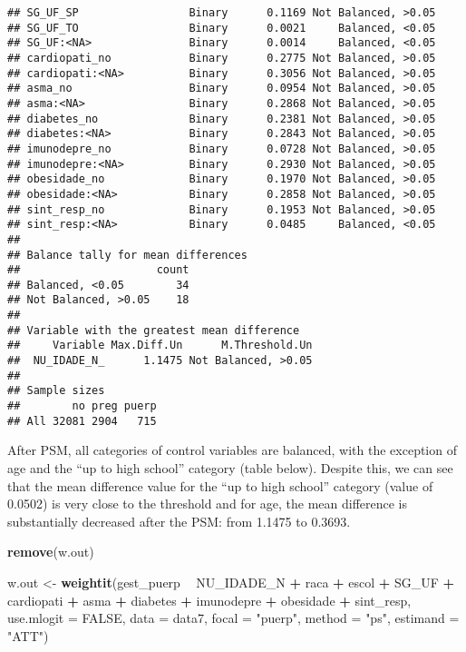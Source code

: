 \documentclass[
]{article}
\newenvironment{Shaded}{\begin{snugshade}}{\end{snugshade}}
\newcommand{\DataTypeTok}[1]{\textcolor[rgb]{0.13,0.29,0.53}{#1}}
\newcommand{\KeywordTok}[1]{\textcolor[rgb]{0.13,0.29,0.53}{\textbf{#1}}}
\newcommand{\NormalTok}[1]{#1}
\newcommand{\OperatorTok}[1]{\textcolor[rgb]{0.81,0.36,0.00}{\textbf{#1}}}
\newcommand{\OtherTok}[1]{\textcolor[rgb]{0.56,0.35,0.01}{#1}}
\newcommand{\StringTok}[1]{\textcolor[rgb]{0.31,0.60,0.02}{#1}}
\begin{document}
\begin{verbatim}
## SG_UF_SP                 Binary      0.1169 Not Balanced, >0.05
## SG_UF_TO                 Binary      0.0021     Balanced, <0.05
## SG_UF:<NA>               Binary      0.0014     Balanced, <0.05
## cardiopati_no            Binary      0.2775 Not Balanced, >0.05
## cardiopati:<NA>          Binary      0.3056 Not Balanced, >0.05
## asma_no                  Binary      0.0954 Not Balanced, >0.05
## asma:<NA>                Binary      0.2868 Not Balanced, >0.05
## diabetes_no              Binary      0.2381 Not Balanced, >0.05
## diabetes:<NA>            Binary      0.2843 Not Balanced, >0.05
## imunodepre_no            Binary      0.0728 Not Balanced, >0.05
## imunodepre:<NA>          Binary      0.2930 Not Balanced, >0.05
## obesidade_no             Binary      0.1970 Not Balanced, >0.05
## obesidade:<NA>           Binary      0.2858 Not Balanced, >0.05
## sint_resp_no             Binary      0.1953 Not Balanced, >0.05
## sint_resp:<NA>           Binary      0.0485     Balanced, <0.05
## 
## Balance tally for mean differences
##                     count
## Balanced, <0.05        34
## Not Balanced, >0.05    18
## 
## Variable with the greatest mean difference
##     Variable Max.Diff.Un      M.Threshold.Un
##  NU_IDADE_N_      1.1475 Not Balanced, >0.05
## 
## Sample sizes
##        no preg puerp
## All 32081 2904   715
\end{verbatim}

After PSM, all categories of control variables are balanced, with the
exception of age and the ``up to high school'' category (table below).
Despite this, we can see that the mean difference value for the ``up to
high school'' category (value of 0.0502) is very close to the threshold
and for age, the mean difference is substantially decreased after the
PSM: from 1.1475 to 0.3693.

\begin{Shaded}
\begin{Highlighting}[]
\KeywordTok{remove}\NormalTok{(w.out)}

\NormalTok{w.out <-}\StringTok{ }\KeywordTok{weightit}\NormalTok{(gest_puerp }\OperatorTok{~}\StringTok{ }\NormalTok{NU_IDADE_N }\OperatorTok{+}\StringTok{ }\NormalTok{raca }\OperatorTok{+}\StringTok{ }\NormalTok{escol }\OperatorTok{+}\StringTok{ }\NormalTok{SG_UF }\OperatorTok{+}\StringTok{ }\NormalTok{cardiopati }\OperatorTok{+}\StringTok{ }\NormalTok{asma }\OperatorTok{+}\StringTok{ }
\StringTok{                    }\NormalTok{diabetes }\OperatorTok{+}\StringTok{ }\NormalTok{imunodepre }\OperatorTok{+}\StringTok{ }\NormalTok{obesidade }\OperatorTok{+}\StringTok{ }\NormalTok{sint_resp, }\DataTypeTok{use.mlogit =} \OtherTok{FALSE}\NormalTok{, }
                  \DataTypeTok{data =}\NormalTok{ data7, }\DataTypeTok{focal =} \StringTok{"puerp"}\NormalTok{, }\DataTypeTok{method =} \StringTok{"ps"}\NormalTok{, }\DataTypeTok{estimand =} \StringTok{"ATT"}\NormalTok{)}
\end{Highlighting}
\end{Shaded}
\end{document}

